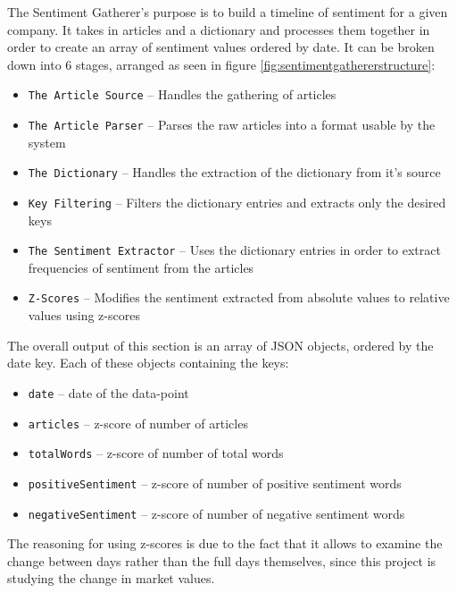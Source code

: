 The Sentiment Gatherer's purpose is to build a timeline of sentiment for a given company. It takes in articles and a dictionary and processes them together in order to create an array of sentiment values ordered by date. It can be broken down into 6 stages, arranged as seen in figure \ref{fig:sentimentgathererstructure}:
\begin{itemize}
    \item \texttt{The Article Source} -- Handles the gathering of articles
    \item \texttt{The Article Parser} -- Parses the raw articles into a format usable by the system
    \item \texttt{The Dictionary} -- Handles the extraction of the dictionary from it's source
    \item \texttt{Key Filtering} -- Filters the dictionary entries and extracts only the desired keys
    \item \texttt{The Sentiment Extractor} -- Uses the dictionary entries in order to extract frequencies of sentiment from the articles
    \item \texttt{Z-Scores} -- Modifies the sentiment extracted from absolute values to relative values using z-scores
\end{itemize}

The overall output of this section is an array of JSON objects, ordered by the date key. Each of these objects containing the keys:
\begin{itemize}
    \item \texttt{date} -- date of the data-point
    \item \texttt{articles} -- z-score of number of articles
    \item \texttt{totalWords} -- z-score of number of total words
    \item \texttt{positiveSentiment} -- z-score of number of positive sentiment words
    \item \texttt{negativeSentiment} -- z-score of number of negative sentiment words
\end{itemize}
The reasoning for using z-scores is due to the fact that it allows to examine the change between days rather than the full days themselves, since this project is studying the change in market values.


